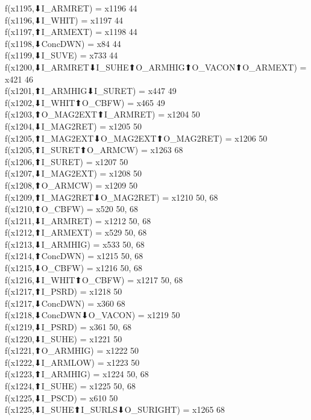f(x1195,⬇I_ARMRET) = x1196 {44} \\
f(x1196,⬇I_WHIT) = x1197 {44} \\
f(x1197,⬆I_ARMEXT) = x1198 {44} \\
f(x1198,⬇ConcDWN) = x84 {44} \\
f(x1199,⬇I_SUVE) = x733 {44} \\
f(x1200,⬇I_ARMRET⬇I_SUHE⬆O_ARMHIG⬆O_VACON⬆O_ARMEXT) = x421 {46} \\
f(x1201,⬆I_ARMHIG⬇I_SURET) = x447 {49} \\
f(x1202,⬇I_WHIT⬆O_CBFW) = x465 {49} \\
f(x1203,⬆O_MAG2EXT⬆I_ARMRET) = x1204 {50} \\
f(x1204,⬇I_MAG2RET) = x1205 {50} \\
f(x1205,⬆I_MAG2EXT⬇O_MAG2EXT⬆O_MAG2RET) = x1206 {50} \\
f(x1205,⬆I_SURET⬆O_ARMCW) = x1263 {68} \\
f(x1206,⬆I_SURET) = x1207 {50} \\
f(x1207,⬇I_MAG2EXT) = x1208 {50} \\
f(x1208,⬆O_ARMCW) = x1209 {50} \\
f(x1209,⬆I_MAG2RET⬇O_MAG2RET) = x1210 {50, 68} \\
f(x1210,⬆O_CBFW) = x520 {50, 68} \\
f(x1211,⬇I_ARMRET) = x1212 {50, 68} \\
f(x1212,⬆I_ARMEXT) = x529 {50, 68} \\
f(x1213,⬇I_ARMHIG) = x533 {50, 68} \\
f(x1214,⬆ConcDWN) = x1215 {50, 68} \\
f(x1215,⬇O_CBFW) = x1216 {50, 68} \\
f(x1216,⬇I_WHIT⬆O_CBFW) = x1217 {50, 68} \\
f(x1217,⬆I_PSRD) = x1218 {50} \\
f(x1217,⬇ConcDWN) = x360 {68} \\
f(x1218,⬇ConcDWN⬇O_VACON) = x1219 {50} \\
f(x1219,⬇I_PSRD) = x361 {50, 68} \\
f(x1220,⬇I_SUHE) = x1221 {50} \\
f(x1221,⬆O_ARMHIG) = x1222 {50} \\
f(x1222,⬇I_ARMLOW) = x1223 {50} \\
f(x1223,⬆I_ARMHIG) = x1224 {50, 68} \\
f(x1224,⬆I_SUHE) = x1225 {50, 68} \\
f(x1225,⬇I_PSCD) = x610 {50} \\
f(x1225,⬇I_SUHE⬆I_SURLS⬇O_SURIGHT) = x1265 {68} \\
